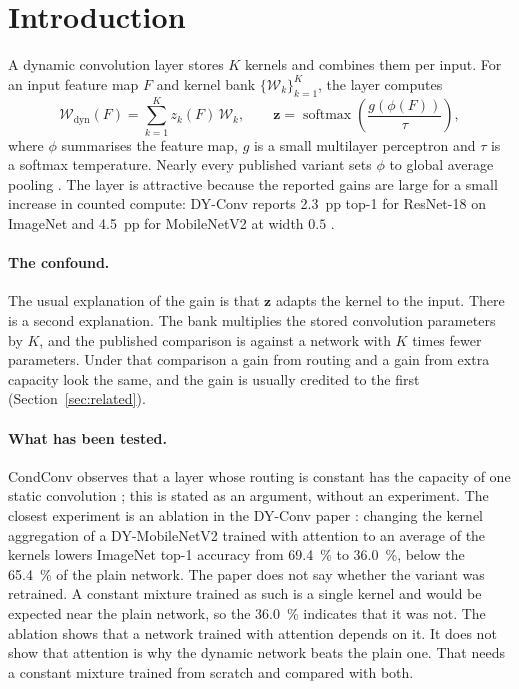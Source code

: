 \documentclass[10pt,a4paper]{article}
\newcommand{\zv}{\mathbf{z}}
\begin{document}
\section{Introduction}\label{sec:intro}

A dynamic convolution layer stores $K$ kernels and combines them per
input. For an input feature map $F$ and kernel bank
$\{\mathcal{W}_k\}_{k=1}^{K}$, the layer computes
\begin{equation}
\mathcal{W}_{\text{dyn}}(F)=\sum_{k=1}^{K} z_k(F)\,\mathcal{W}_k,
\qquad
\zv=\operatorname{softmax}\!\left(\frac{g(\phi(F))}{\tau}\right),
\label{eq:dynconv}
\end{equation}
where $\phi$ summarises the feature map, $g$ is a small multilayer
perceptron and $\tau$ is a softmax temperature. Nearly every published
variant sets $\phi$ to global average pooling
\citep{yang2019condconv,chen2020dynamic}. The layer is attractive because
the reported gains are large for a small increase in counted compute:
DY-Conv reports \SI{2.3}{pp} top-1 for ResNet-18 on ImageNet and
\SI{4.5}{pp} for MobileNetV2 at width $0.5$ \citep{chen2020dynamic}.

\paragraph{The confound.} The usual explanation of the gain is that $\zv$
adapts the kernel to the input. There is a second explanation. The bank
multiplies the stored convolution parameters by $K$, and the published
comparison is against a network with $K$ times fewer parameters. Under that
comparison a gain from routing and a gain from extra capacity look the same,
and the gain is usually credited to the first
(Section~\ref{sec:related}).

\paragraph{What has been tested.} CondConv observes that a layer whose
routing is constant has the capacity of one static convolution
\citep[Section 3]{yang2019condconv}; this is stated as an argument, without
an experiment. The closest experiment is an ablation in the DY-Conv paper
\citep[Table 3]{chen2020dynamic}: changing the kernel aggregation of a
DY-MobileNetV2 trained with attention to an average of the kernels lowers
ImageNet top-1 accuracy from \SI{69.4}{\percent} to \SI{36.0}{\percent},
below the \SI{65.4}{\percent} of the plain network. The paper does not say
whether the variant was retrained. A constant mixture trained as such is a
single kernel and would be expected near the plain network, so the
\SI{36.0}{\percent} indicates that it was not. The ablation shows that a
network trained with attention depends on it. It does not show that
attention is why the dynamic network beats the plain one. That needs a
constant mixture trained from scratch and compared with both.
\end{document}
